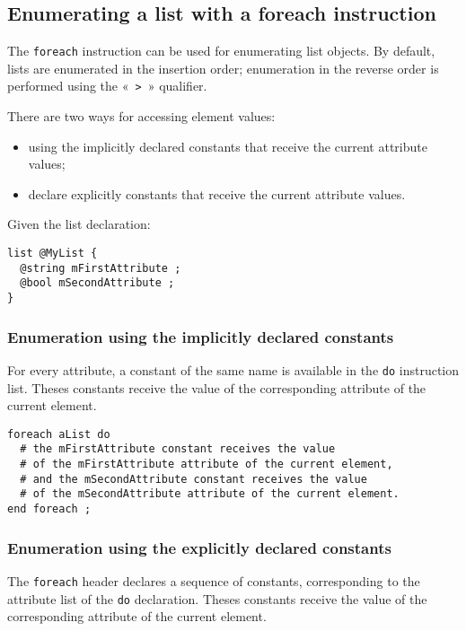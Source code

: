 \subsection{Enumerating a list with a foreach instruction}

The \lstinline[language=galgas]!foreach! instruction can be used for enumerating list objects. By default, lists are enumerated in the insertion order; enumeration in the reverse order is performed using the «~\lstinline[language=galgas]!>!~» qualifier.

There are two ways for accessing element values:
\begin{itemize}
\item using the implicitly declared constants that receive the current attribute values;
\item declare explicitly constants that receive the current attribute values.
\end{itemize}

Given the list declaration:

\begin{lstlisting}[language=galgas]
list @MyList {
  @string mFirstAttribute ;
  @bool mSecondAttribute ;
}
\end{lstlisting}

\subsubsection{Enumeration using the implicitly declared constants}

For every attribute, a constant of the same name is available in the \lstinline[language=galgas]!do! instruction list. Theses constants receive the value of the corresponding attribute of the current element.

\begin{lstlisting}[language=galgas]
foreach aList do
  # the mFirstAttribute constant receives the value
  # of the mFirstAttribute attribute of the current element,
  # and the mSecondAttribute constant receives the value
  # of the mSecondAttribute attribute of the current element.
end foreach ;
\end{lstlisting}

\subsubsection{Enumeration using the explicitly declared constants}

The \lstinline[language=galgas]!foreach! header declares a sequence of constants, corresponding to the attribute list of the \lstinline[language=galgas]!do! declaration. Theses constants receive the value of the corresponding attribute of the current element.


